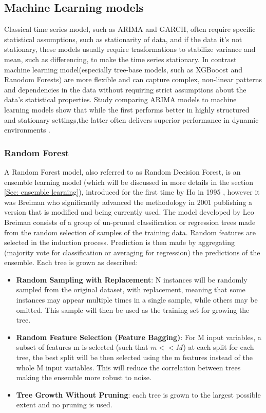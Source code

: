 \subsection{Machine Learning models} %
Classical time series model, such as ARIMA and GARCH, often require specific statistical assumptions, such as stationarity of data, and if the data it's not stationary, these models usually require trasformations to stabilize variance and mean, such as differencing, to make the time series stationary. In contrast machine learning model(especially tree-base models, such as XGBooost and Ranodom Forests) are more flexible and can capture complex, non-linear patterns and dependencies in the data without requiring strict assumptions about the data's statistical properties. Study comparing ARIMA models to machine learning models show that while the first performs better in highly structured and stationary settings,the latter often delivers superior performance in dynamic environments \cite{Kontopoulou2023}.

\subsubsection{Random Forest}
\label{Sec: Random Forest}
A Random Forest model, also referred to as Random Decision Forest, is an ensemble learning model (which will be discussed in more details in the section \ref{Sec: ensemble learning}), introduced for the first time by Ho in 1995 \cite{Ho1995}, however it was Breiman who significantly advanced the methodology in 2001 \cite{Breiman2001} publishing a version that is modified and being currently used. The model developed by Leo Breiman consists of a group of un-pruned classification or regression trees made from the random selection of samples of the training data. Random features are selected in the induction process. Prediction is then made by aggregating (majority vote for classification or averaging for regression) the predictions of the ensemble. Each tree is grown as described:
\begin{itemize}
\item \textbf{Random Sampling with Replacement}: N instances will be randomly sampled from the original dataset, with replacement, meaning that some instances may appear multiple times in a single sample, while others may be omitted. This sample will then be used as the training set for growing the tree.
\item \textbf{Random Feature Selection (Feature Bagging)}: For M input variables, a subset of features m is selected (such that $m<<M$) at each split for each tree, the best split will be then selected using the m features instead of the whole M input variables. This will reduce the correlation between trees making the ensemble more robust to noise.
\item \textbf{Tree Growth Without Pruning}: each tree is grown to the largest possible extent and no pruning is used.
\end{itemize}

